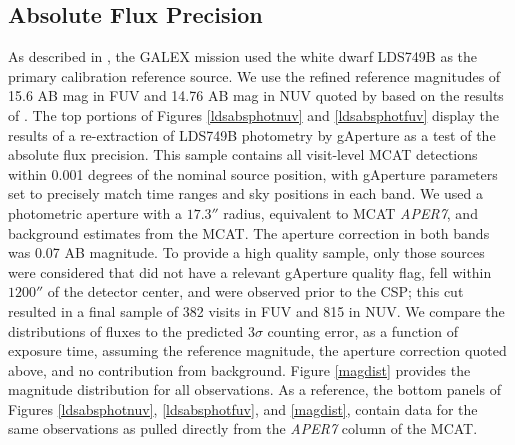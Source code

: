 \documentclass[iop]{emulateapj}
\begin{document}
\subsection{Absolute Flux Precision}
As described in \citet{mor2007}, the GALEX mission used the white dwarf LDS749B as the primary calibration reference source. We use the refined reference magnitudes of 15.6 AB mag in FUV and 14.76 AB mag in NUV quoted by \cite{camarota2014white} based on the results of \cite{bohlin2008absolute}. The top portions of Figures \ref{ldsabsphotnuv} and \ref{ldsabsphotfuv} display the results of a re-extraction of LDS749B photometry by gAperture as a test of the absolute flux precision. This sample contains all visit-level MCAT detections within 0.001 degrees of the nominal source position, with gAperture parameters set to precisely match time ranges and sky positions in each band. We used a photometric aperture with a $17.3''$ radius, equivalent to MCAT \emph{APER7}, and background estimates from the MCAT. The aperture correction in both bands was 0.07 AB magnitude. To provide a high quality sample, only those sources were considered that did not have a relevant gAperture quality flag, fell within $1200''$ of the detector center, and were observed prior to the CSP; this cut resulted in a final sample of 382 visits in FUV and 815 in NUV. We compare the distributions of fluxes to the predicted 3$\sigma$ counting error, as a function of exposure time, assuming the reference magnitude, the aperture correction quoted above, and no contribution from background. Figure \ref{magdist} provides the magnitude distribution for all observations. As a reference, the bottom panels of Figures \ref{ldsabsphotnuv}, \ref{ldsabsphotfuv}, and \ref{magdist}, contain data for the same observations as pulled directly from the \emph{APER7} column of the MCAT.
\end{document}
